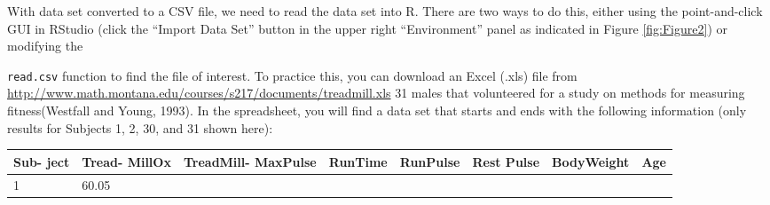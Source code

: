 \documentclass[]{article}
\begin{document}
With data set converted to a CSV file, we need to read the data set into
R. There are two ways to do this, either using the point-and-click GUI
in RStudio (click the ``Import Data Set'' button in the upper right
``Environment'' panel as indicated in Figure \ref{fig:Figure2}) or
modifying the

\texttt{read.csv} function to find the file of interest. To practice
this, you can download an Excel (.xls) file from
\url{http://www.math.montana.edu/courses/s217/documents/treadmill.xls}
31 males that volunteered for a study on methods for measuring
fitness(Westfall and Young, 1993). In the spreadsheet, you will find a
data set that starts and ends with the following information (only
results for Subjects 1, 2, 30, and 31 shown here):

\begin{longtable}[]{@{}lllrrlrr@{}}
\toprule
\begin{minipage}[b]{0.07\columnwidth}\raggedright\strut
Sub- ject\strut
\end{minipage} & \begin{minipage}[b]{0.10\columnwidth}\raggedright\strut
Tread- MillOx\strut
\end{minipage} & \begin{minipage}[b]{0.14\columnwidth}\raggedright\strut
TreadMill- MaxPulse\strut
\end{minipage} & \begin{minipage}[b]{0.09\columnwidth}\raggedleft\strut
RunTime\strut
\end{minipage} & \begin{minipage}[b]{0.10\columnwidth}\raggedleft\strut
RunPulse\strut
\end{minipage} & \begin{minipage}[b]{0.08\columnwidth}\raggedright\strut
Rest Pulse\strut
\end{minipage} & \begin{minipage}[b]{0.15\columnwidth}\raggedleft\strut
BodyWeight\strut
\end{minipage} & \begin{minipage}[b]{0.04\columnwidth}\raggedleft\strut
Age\strut
\end{minipage}\tabularnewline
\midrule
\endhead
\begin{minipage}[t]{0.07\columnwidth}\raggedright\strut
1\strut
\end{minipage} & \begin{minipage}[t]{0.10\columnwidth}\raggedright\strut
60.05\strut
\end{minipage} & \begin{minipage}[t]{0.14\columnwidth}\raggedright\strut

\end{minipage}
\end{longtable}
\end{document}
